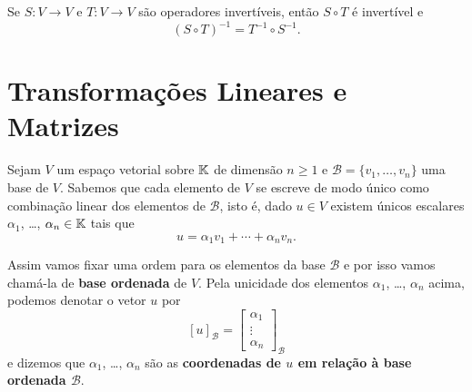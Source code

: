 \begin{proposicao}
    Se $S \colon V \to V$ e $T \colon V \to V$ são operadores invertíveis, então $S \circ T$ é invertível e
    \[
      (S \circ T)^{-1}= T^{-1}\circ S^{-1}.
    \]
\end{proposicao}

\section{Transformações Lineares e Matrizes} %
\label{sec:transformacoes_lineares_e_matrizes}

Sejam $V$ um espaço vetorial sobre $\mathbb{K}$ de dimensão $n \ge 1$ e $\mathcal{B} = \{v_1,\dots,v_n\}$ uma base de $V$. Sabemos que cada elemento de $V$ se escreve de modo único como combinação linear dos elementos de $\mathcal{B}$, isto é, dado $u \in V$ existem únicos escalares $\alpha_1$, \dots, $\alpha_n \in \mathbb{K}$ tais que
\[
    u = \alpha_1v_1 + \cdots + \alpha_nv_n.
\]

Assim vamos fixar uma ordem para os elementos da base $\mathcal{B}$ e por isso vamos chamá-la de \textbf{base ordenada} de $V$. Pela unicidade dos elementos $\alpha_1$, \dots, $\alpha_n$ acima, podemos denotar o vetor $u$ por
\[
    [u]_\mathcal{B} = \begin{bmatrix}
    \alpha_1\\
    \vdots\\
    \alpha_n
    \end{bmatrix}_\mathcal{B}
\]
e dizemos que $\alpha_1$, \dots, $\alpha_n$ são as \textbf{coordenadas de $u$ em relação à base ordenada $\mathcal{B}$}.

